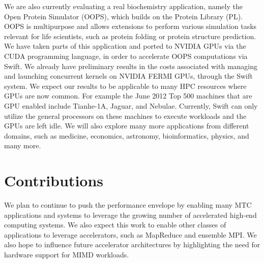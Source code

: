 \documentclass[conference]{IEEEtran}
\begin{document}
We are also currently evaluating a real biochemistry application, namely the Open Protein Simulator (OOPS), which builds on the Protein Library (PL). OOPS is multipurpose and allows extensions to perform various simulation tasks relevant for life scientists, such as protein folding or protein structure prediction.\cite{OOPS} We have taken parts of this application and ported to NVIDIA GPUs via the CUDA programming language, in order to accelerate OOPS computations via Swift. We already have preliminary results in the costs associated with managing and launching concurrent kernels on NVIDIA FERMI GPUs, through the Swift system. We expect our results to be applicable to many HPC resources where GPUs are now common. For example the June 2012 Top 500 machines that are GPU enabled include Tianhe-1A, Jaguar, and Nebulae. Currently, Swift can only utilize the general processors on these machines to execute workloads and the GPUs are left idle. We will also explore many more applications from different domains, such as medicine, economics, astronomy, bioinformatics, physics, and many more.
\section{Contributions}
We plan to continue to push the performance envelope by enabling many MTC applications and systems to leverage the growing number of accelerated high-end computing systems. We also expect this work to enable other classes of applications to leverage accelerators, such as MapReduce and ensemble MPI. We also hope to influence future accelerator architectures by highlighting the need for hardware support for MIMD workloads.



\end{document}
